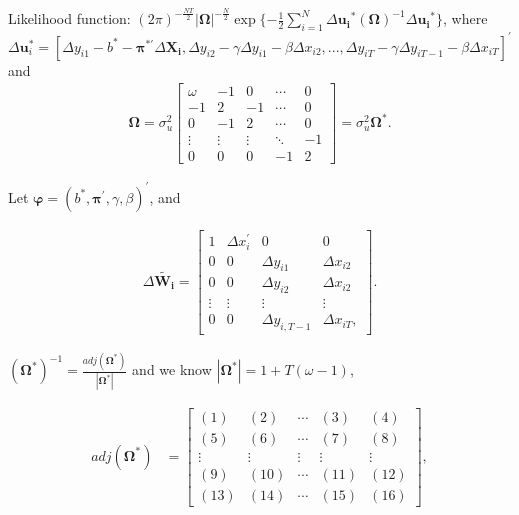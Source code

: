 \documentclass[12pt,a4paper,hyperref]{article}
\begin{document}
Likelihood function: $(2 \pi)^{-\frac{NT}{2}}|\boldsymbol{\Omega}|^{-\frac{N}{2}}\exp \{-\frac{1}{2} \sum_{i=1}^{N} \Delta \boldsymbol{u_{i}}^{*} (\boldsymbol{\Omega})^{-1} \Delta \boldsymbol{u_{i}}^{*} \}$, where \\
$ \Delta \boldsymbol{u}^{*}_{i}=[\Delta y_{i1}-b^{*}-\boldsymbol{\pi}^{*'}\Delta \boldsymbol{X_{i}},
 \Delta y_{i2}-\gamma \Delta y_{i1}-\beta \Delta x_{i2},..., \Delta y_{iT}-\gamma \Delta y_{iT-1}-\beta \Delta x_{iT} ]^{'} $ and
 \begin{align*}
   \boldsymbol{\Omega}= \sigma^{2}_{u}
\begin{bmatrix}
 \omega & -1     & 0      &   \cdots   & 0  \\
 -1     & 2      & -1     &    \cdots  &  0   \\
  0     & -1     &  2     &     \cdots &  0   \\
\vdots  & \vdots & \vdots & \ddots     & -1 \\
0       &  0     & 0      & -1         & 2
\end{bmatrix}
=\sigma^{2}_{u}  \boldsymbol{\Omega}^{*}.
\end{align*}


Let $\boldsymbol{\varphi} =(b^{*}, \boldsymbol{\pi^{'}}, \gamma , \beta)^{'}$, and




\begin{align*}
\Delta \boldsymbol{\tilde{W_{i}}}=
\begin{bmatrix}
1 & \Delta x^{'}_{i} & 0 & 0 \\
0 & 0 & \Delta y_{i1} & \Delta x_{i2} \\
0 & 0 & \Delta y_{i2} & \Delta x_{i2} \\
 \vdots & \vdots & \vdots & \vdots    \\
0 & 0 & \Delta y_{i,T-1} &  \Delta x_{iT},
\end{bmatrix}.
\end{align*}

$(\boldsymbol{\Omega^{*}})^{-1} = \frac{adj( \boldsymbol{\Omega^{*}})}{| \boldsymbol{\Omega^{*}}|}$ and we know  $| \boldsymbol{\Omega^{*}}|=1+T(\omega-1)$,

\begin{align*}
adj( \boldsymbol{\Omega^{*}})&=
\begin{bmatrix}
   (1)    &   (2)   &   \cdots  & (3)    &  (4)  \\
   (5)    & (6)     &  \cdots   &  (7)   &  (8)   \\
   \vdots &  \vdots &  \vdots   & \vdots & \vdots \\
   (9)    & (10)    &   \cdots  & (11)   & (12)   \\
  (13)    & (14)    &  \cdots   & (15)   & (16)
\end{bmatrix},
\end{align*}
\end{document}
